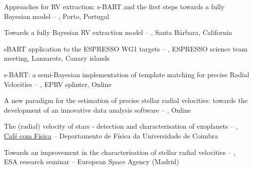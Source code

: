 
\begin{rubric}{}

	Approaches for RV extraction: s-BART and the first steps towards a fully Bayesian model -- , Porto, Portugal

	Towards a fully Bayesian RV extraction model -- , Santa Bárbara, California

	sBART application to the ESPRESSO WG1 targets -- , ESPRESSO science team meeting, Lanzarote, Canary islands

\entry*[Exoplanets IV]
	s-BART: a semi-Bayesian implementation of template matching for precise Radial Velocities -- , EPRV splinter, Online 

 A new paradigm for the estimation of precise stellar radial velocities: towards the development of an innovative data analysis software -- , Online


\entry*[2024]
	The (radial) velocity of stars - detection and characterisation of exoplanets  -- , \href{https://indico.lip.pt/category/38/}{Café com Física} --  Departamento de Física da Universidade de Coimbra 

\entry*[2024]
	Towards an improvement in the characterisation of stellar radial velocities  -- , ESA research seminar --  European Space Agency (Madrid) 


\end{rubric}

